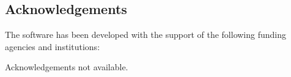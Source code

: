 \subsection{Acknowledgements}
\label{sec::Composyx:acknowledgements}

The software has been developed with the support of the following funding agencies and institutions: 




Acknowledgements not available.


